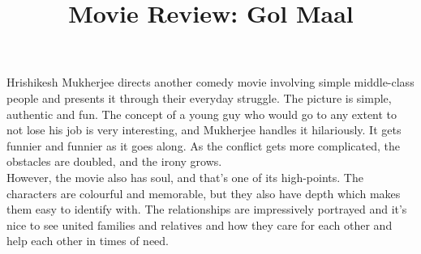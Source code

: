 \documentclass[12pt, a4paper]{article}
\title{Movie Review: Gol Maal}
\author{}
\date{}
\begin{document}
\maketitle

Hrishikesh Mukherjee directs another comedy movie involving simple middle-class people and presents it through their everyday struggle. The picture is simple, authentic and fun. The concept of a young guy who would go to any extent to not lose his job is very interesting, and Mukherjee handles it hilariously. It gets funnier and funnier as it goes along. As the conflict gets more complicated, the obstacles are doubled, and the irony grows.\\

However, the movie also has soul, and that's one of its high-points. The characters are colourful and memorable, but they also have depth which makes them easy to identify with. The relationships are impressively portrayed and it's nice to see united families and relatives and how they care for each other and help each other in times of need.
\end{document}
